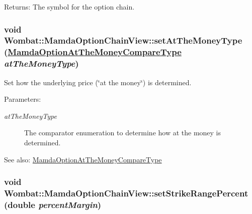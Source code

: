 \begin{Desc}
\item[Returns:]The symbol for the option chain. \end{Desc}
\hypertarget{classWombat_1_1MamdaOptionChainView_007f361ace810f89307a2546432fe00f}{
\subsubsection[setAtTheMoneyType]{\setlength{\rightskip}{0pt plus 5cm}void Wombat::Mamda\-Option\-Chain\-View::set\-At\-The\-Money\-Type (\hyperlink{namespaceWombat_a07b06a78fb02e1f93ee37a2d944c33a}{Mamda\-Option\-At\-The\-Money\-Compare\-Type} {\em at\-The\-Money\-Type})}}
\label{classWombat_1_1MamdaOptionChainView_007f361ace810f89307a2546432fe00f}


Set how the underlying price (\char`\"{}at the money\char`\"{}) is determined. 

\begin{Desc}
\item[Parameters:]
\begin{description}
\item[{\em at\-The\-Money\-Type}]The comparator enumeration to determine how at the money is determined.\end{description}
\end{Desc}
\begin{Desc}
\item[See also:]\hyperlink{namespaceWombat_a07b06a78fb02e1f93ee37a2d944c33a}{Mamda\-Option\-At\-The\-Money\-Compare\-Type} \end{Desc}
\hypertarget{classWombat_1_1MamdaOptionChainView_c76bb8a0940dbb60297010fb3e8504a6}{
\subsubsection[setStrikeRangePercent]{\setlength{\rightskip}{0pt plus 5cm}void Wombat::Mamda\-Option\-Chain\-View::set\-Strike\-Range\-Percent (double {\em percent\-Margin})}}
\label{classWombat_1_1MamdaOptionChainView_c76bb8a0940dbb60297010fb3e8504a6}


